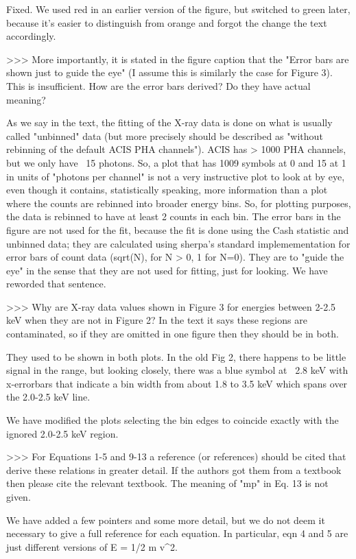 Fixed. We used red in an earlier version of the figure, but switched to green later, because it's easier to distinguish from orange and forgot the change the text accordingly.

>>> More importantly, it is stated in the figure caption that the "Error bars are shown just to guide the eye" (I assume this is similarly the case for Figure 3). This is insufficient. How are the error bars derived? Do they have actual meaning? 

As we say in the text, the fitting of the X-ray data is done on what is usually called "unbinned" data (but more precisely should be described as "without rebinning of the default ACIS PHA channels"). ACIS has > 1000 PHA channels, but we only have ~15 photons. So, a plot that has 1009 symbols at 0 and 15 at 1 in units of "photons per channel" is not a very instructive plot to look at by eye, even though it contains, statistically speaking, more information than a plot where the counts are rebinned into broader energy bins. So, for plotting purposes, the data is rebinned to have at least 2 counts in each bin. The error bars in the figure are not used for the fit, because the fit is done using the Cash statistic and unbinned data; they are calculated using sherpa's standard implemementation for error bars of count data (sqrt(N), for N > 0, 1 for N=0). They are to "guide the eye" in the sense that they are not used for fitting, just for looking. We have reworded that sentence.

>>> Why are X-ray data values shown in Figure 3 for energies between 2-2.5 keV when they are not in Figure 2? In the text it says these regions are contaminated, so if they are omitted in one figure then they should be in both.

They used to be shown in both plots. In the old Fig 2, there happens to be little signal in the range, but looking closely, there was a blue symbol at ~2.8 keV with x-errorbars that indicate a bin width from about 1.8 to 3.5 keV which spans over the 2.0-2.5 keV line. 

We have modified the plots selecting the bin edges to coincide exactly with the ignored 2.0-2.5 keV region. 


>>> For Equations 1-5 and 9-13 a reference (or references) should be cited that derive these relations in greater detail. If the authors got them from a textbook then please cite the relevant textbook. The meaning of "mp" in Eq. 13 is not given.

We have added a few pointers and some more detail, but we do not deem it necessary to give a full reference for each equation. In particular, eqn 4 and 5 are just different versions of E = 1/2 m v^2.

